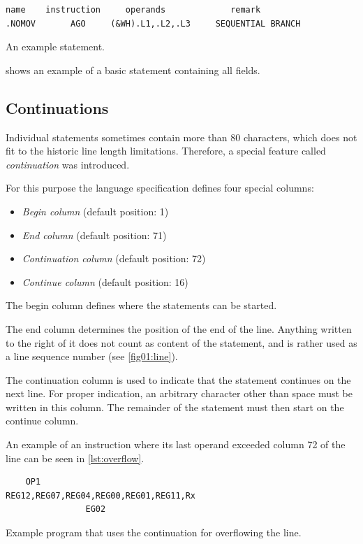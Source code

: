 \begin{listing}[t]
	\begin{verbatim}
name    instruction     operands             remark
.NOMOV       AGO     (&WH).L1,.L2,.L3     SEQUENTIAL BRANCH
	\end{verbatim}
	\caption{An example statement.}
	\label{lst:small_example}
\end{listing}

 shows an example of a basic statement containing all fields.

\subsection{Continuations}
\label{Continuation}

Individual statements sometimes contain more than 80 characters, which does not fit to the historic line length limitations. Therefore, a special feature called \emph{continuation} was introduced.

For this purpose the language specification defines four special columns:
\begin{itemize}
	\item \emph{Begin column} (default position: 1)
	
	\item \emph{End column} (default position: 71)
	
	\item \emph{Continuation column} (default position: 72)
	
	\item \emph{Continue column} (default position: 16)
\end{itemize}

The begin column defines where the statements can be started.

The end column determines the position of the end of the line. Anything written to the right of it  does not count as content of the statement, and is rather used as a line sequence number (see \cref{fig01:line}).

The continuation column is used to indicate that the statement continues on the next line. For proper indication, an arbitrary character other than space must be written in this column. The remainder of the statement must then start on the continue column.

An example of an instruction where its last operand exceeded column 72 of the line can be seen in \cref{lst:overflow}.

\begin{listing}[t]
	\begin{verbatim}
    OP1                            REG12,REG07,REG04,REG00,REG01,REG11,Rx
                EG02
	\end{verbatim}
	\caption{Example program that uses the continuation for overflowing the line.}
	\label{lst:overflow}
\end{listing}

